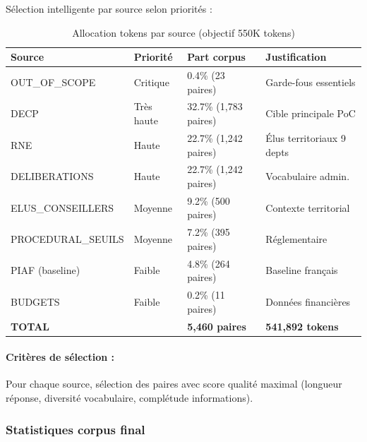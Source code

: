Sélection intelligente par source selon priorités :

\begin{table}[h]
\centering
\small
\caption{Allocation tokens par source (objectif 550K tokens)}
\label{tab:token_allocation}
\begin{tabular}{@{}p{3.8cm}p{1.8cm}p{3cm}p{4.5cm}@{}}
\toprule
\textbf{Source} & \textbf{Priorité} & \textbf{Part corpus} & \textbf{Justification} \\ \midrule
OUT\_OF\_SCOPE & Critique & 0.4\% (23 paires) & Garde-fous essentiels \\
DECP & Très haute & 32.7\% (1{,}783 paires) & Cible principale PoC \\
RNE & Haute & 22.7\% (1{,}242 paires) & Élus territoriaux 9 depts \\
DELIBERATIONS & Haute & 22.7\% (1{,}242 paires) & Vocabulaire admin. \\
ELUS\_CONSEILLERS & Moyenne & 9.2\% (500 paires) & Contexte territorial \\
PROCEDURAL\_SEUILS & Moyenne & 7.2\% (395 paires) & Réglementaire \\
PIAF (baseline) & Faible & 4.8\% (264 paires) & Baseline français \\
BUDGETS & Faible & 0.2\% (11 paires) & Données financières \\ \midrule
\textbf{TOTAL} & & \textbf{5{,}460 paires} & \textbf{541{,}892 tokens} \\ \bottomrule
\end{tabular}
\end{table}

\paragraph{Critères de sélection :} Pour chaque source, sélection des paires avec score qualité maximal (longueur réponse, diversité vocabulaire, complétude informations).

\subsubsection{Statistiques corpus final}

